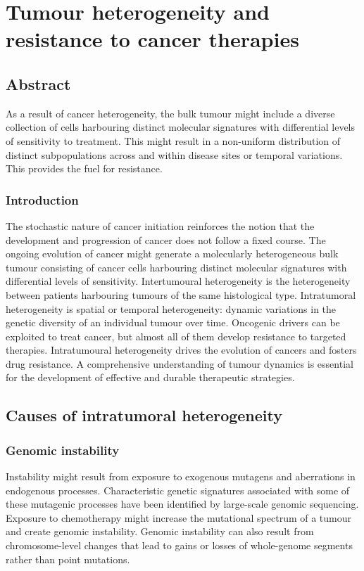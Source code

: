 \graphicspath{{chapters/papers/03/images}}
\chapter{Tumour heterogeneity and resistance to cancer therapies}

\section{Abstract}
As a result of cancer heterogeneity, the bulk tumour might include a diverse collection of cells harbouring distinct molecular signatures with differential levels of sensitivity to treatment.
This might result in a non-uniform distribution of distinct subpopulations across and within disease sites or temporal variations.
This provides the fuel for resistance.

	\subsection{Introduction}
	The stochastic nature of cancer initiation reinforces the notion that the development and progression of cancer does not follow a fixed course.
	The ongoing evolution of cancer might generate a molecularly heterogeneous bulk tumour consisting of cancer cells harbouring distinct molecular signatures with differential levels of sensitivity.
	Intertumoural heterogeneity is the heterogeneity between patients harbouring tumours of the same histological type.
	Intratumoral heterogeneity is spatial or temporal heterogeneity: dynamic variations in the genetic diversity of an individual tumour over time.
	Oncogenic drivers can be exploited to treat cancer, but almost all of them develop resistance to targeted therapies.
	Intratumoural heterogeneity drives the evolution of cancers and fosters drug resistance.
	A comprehensive understanding of tumour dynamics is essential for the development of effective and durable therapeutic strategies.

\section{Causes of intratumoral heterogeneity}

	\subsection{Genomic instability}
	Instability might result from exposure to exogenous mutagens and aberrations in endogenous processes.
	Characteristic genetic signatures associated with some of these mutagenic processes have been identified by large-scale genomic sequencing.
	Exposure to chemotherapy might increase the mutational spectrum of a tumour and create genomic instability.
	Genomic instability can also result from chromosome-level changes that lead to gains or losses of whole-genome segments rather than point mutations.

